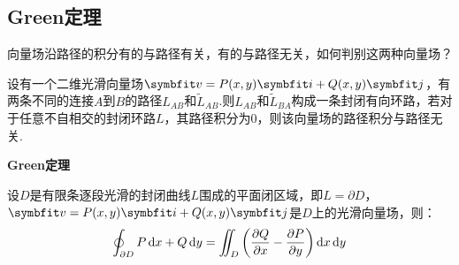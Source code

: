 \subsection{Green定理}
向量场沿路径的积分有的与路径有关，有的与路径无关，如何判别这两种向量场？

设有一个二维光滑向量场$\vb{v} = P(x,y)\vb{i} + Q(x,y)\vb{j}$，有两条不同的连接$A$到$B$的路径$L_{AB}$和$\tilde{L}_{AB}$.则$L_{AB}$和$\tilde{L}_{BA}$构成一条封闭有向环路，若对于任意不自相交的封闭环路$L$，其路径积分为$0$，则该向量场的路径积分与路径无关.

\begin{theorem}
    \textbf{Green定理}
    \label{thm:GreenTheorem}

    设$D$是有限条逐段光滑的封闭曲线$L$围成的平面闭区域，即$L=\partial D$，$\vb{v}=P(x,y)\vb{i}+Q(x,y)\vb{j}$是$D$上的光滑向量场，则：
    \[\oint_{\partial D} P\dd{x} + Q\dd{y} = \iint_D\left(\pdv{Q}{x}-\pdv{P}{y}\right)\dd{x}\dd{y}\]
\end{theorem}

